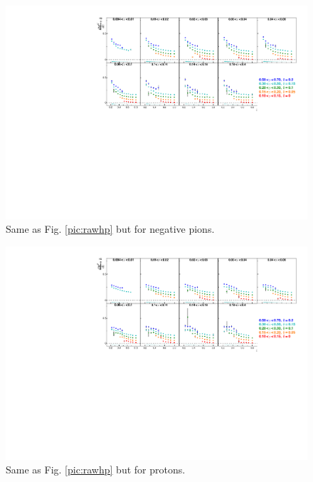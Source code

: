 \begin{figure}[!h]
  \includegraphics[scale=0.85]{./gfx/rawkm.pdf}
  \caption{Same as Fig. \ref{pic:rawhp} but for negative pions.}
  \label{pic:rawkm}
\end{figure}

\begin{figure}[!h]
  \includegraphics[scale=0.85]{./gfx/rawpp.pdf}
  \caption{Same as Fig. \ref{pic:rawhp} but for protons.}
  \label{pic:rawpp}
\end{figure}

\newpage

